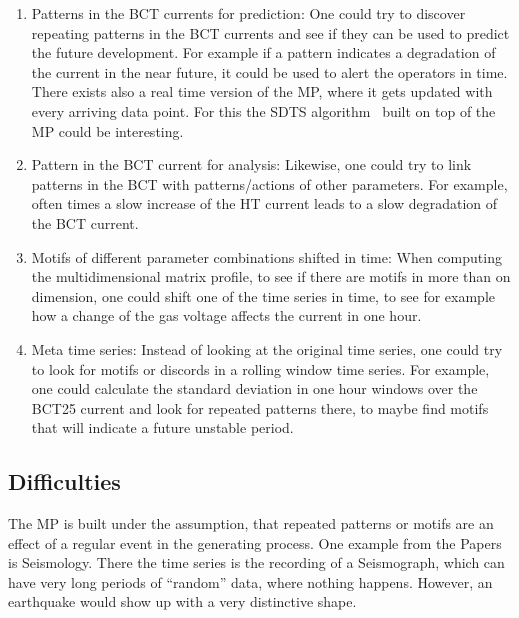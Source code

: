 \documentclass[12pt,a4paper]{article}
\providecommand{\tightlist}{%
	\setlength{\itemsep}{0pt}\setlength{\parskip}{0pt}}
\begin{document}
\begin{enumerate}
\def\labelenumi{\arabic{enumi}.}
\tightlist
\item
  Patterns in the BCT currents for prediction: One could try to discover
  repeating patterns in the BCT currents and see if they can be used to
  predict the future development. For example if a pattern indicates a
  degradation of the current in the near future, it could be used to
  alert the operators in time. There exists also a real time version of
  the MP, where it gets updated with every arriving data point. For this
  the SDTS algorithm~\cite{Yeh:MatrixProfileIV} built on top of
  the MP could be interesting.
\item
  Pattern in the BCT current for analysis: Likewise, one could try to
  link patterns in the BCT with patterns/actions of other parameters.
  For example, often times a slow increase of the HT current leads to a
  slow degradation of the BCT current.
\item
  Motifs of different parameter combinations shifted in time: When
  computing the multidimensional matrix profile, to see if there are
  motifs in more than on dimension, one could shift one of the time
  series in time, to see for example how a change of the gas voltage
  affects the current in one hour.
\item
  Meta time series: Instead of looking at the original time series, one
  could try to look for motifs or discords in a rolling window time
  series. For example, one could calculate the standard deviation in one
  hour windows over the BCT25 current and look for repeated patterns
  there, to maybe find motifs that will indicate a future unstable
  period.
\end{enumerate}

\hypertarget{difficulties}{%
\subsection{Difficulties}\label{difficulties}}

The MP is built under the assumption, that repeated patterns or motifs
are an effect of a regular event in the generating process. One example
from the Papers is Seismology. There the time series is the recording of
a Seismograph, which can have very long periods of ``random'' data,
where nothing happens. However, an earthquake would show up with a very
distinctive shape.
\end{document}
